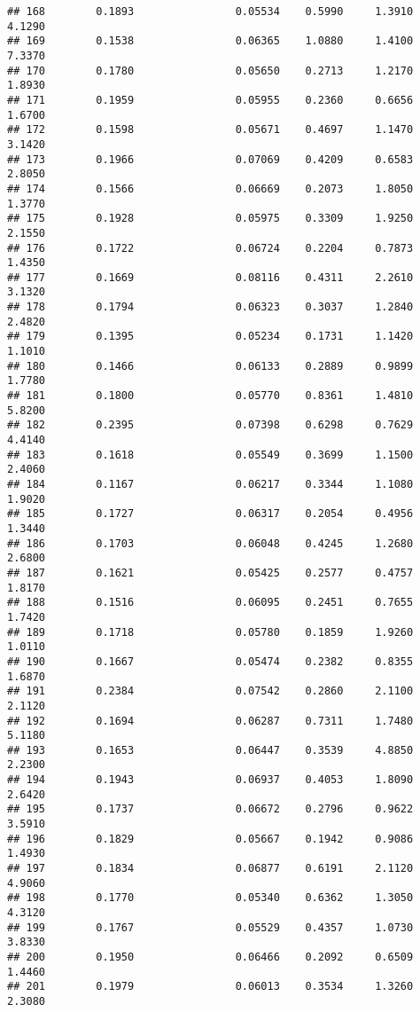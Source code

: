 \documentclass[
]{article}
\begin{document}
\begin{verbatim}
## 168        0.1893                0.05534    0.5990     1.3910       4.1290
## 169        0.1538                0.06365    1.0880     1.4100       7.3370
## 170        0.1780                0.05650    0.2713     1.2170       1.8930
## 171        0.1959                0.05955    0.2360     0.6656       1.6700
## 172        0.1598                0.05671    0.4697     1.1470       3.1420
## 173        0.1966                0.07069    0.4209     0.6583       2.8050
## 174        0.1566                0.06669    0.2073     1.8050       1.3770
## 175        0.1928                0.05975    0.3309     1.9250       2.1550
## 176        0.1722                0.06724    0.2204     0.7873       1.4350
## 177        0.1669                0.08116    0.4311     2.2610       3.1320
## 178        0.1794                0.06323    0.3037     1.2840       2.4820
## 179        0.1395                0.05234    0.1731     1.1420       1.1010
## 180        0.1466                0.06133    0.2889     0.9899       1.7780
## 181        0.1800                0.05770    0.8361     1.4810       5.8200
## 182        0.2395                0.07398    0.6298     0.7629       4.4140
## 183        0.1618                0.05549    0.3699     1.1500       2.4060
## 184        0.1167                0.06217    0.3344     1.1080       1.9020
## 185        0.1727                0.06317    0.2054     0.4956       1.3440
## 186        0.1703                0.06048    0.4245     1.2680       2.6800
## 187        0.1621                0.05425    0.2577     0.4757       1.8170
## 188        0.1516                0.06095    0.2451     0.7655       1.7420
## 189        0.1718                0.05780    0.1859     1.9260       1.0110
## 190        0.1667                0.05474    0.2382     0.8355       1.6870
## 191        0.2384                0.07542    0.2860     2.1100       2.1120
## 192        0.1694                0.06287    0.7311     1.7480       5.1180
## 193        0.1653                0.06447    0.3539     4.8850       2.2300
## 194        0.1943                0.06937    0.4053     1.8090       2.6420
## 195        0.1737                0.06672    0.2796     0.9622       3.5910
## 196        0.1829                0.05667    0.1942     0.9086       1.4930
## 197        0.1834                0.06877    0.6191     2.1120       4.9060
## 198        0.1770                0.05340    0.6362     1.3050       4.3120
## 199        0.1767                0.05529    0.4357     1.0730       3.8330
## 200        0.1950                0.06466    0.2092     0.6509       1.4460
## 201        0.1979                0.06013    0.3534     1.3260       2.3080

\end{verbatim}
\end{document}
